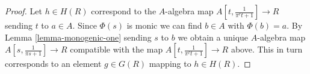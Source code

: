 \documentclass[10pt,a4paper]{amsart}
\theoremstyle{plain}
\theoremstyle{definition}
\theoremstyle{remark}
\numberwithin{equation}{subsection}
\begin{document}
\begin{proof}
Let $h \in H(R)$ correspond to the $A$-algebra map
$A[t, \frac{1}{\pi^\ell t + 1}] \to R$ sending $t$ to $a \in A$.
Since $\Phi(s)$ is monic we can find $b \in A$
with $\Phi(b) = a$. By Lemma \ref{lemma-monogenic-one}
sending $s$ to $b$ we obtain a unique $A$-algebra map
$A[s, \frac{1}{\pi s + 1}] \to R$ compatible
with the map $A[t, \frac{1}{\pi^\ell t + 1}] \to R$ above.
This in turn corresponds to an element $g \in G(R)$
mapping to $h \in H(R)$.
\end{proof}
\end{document}
